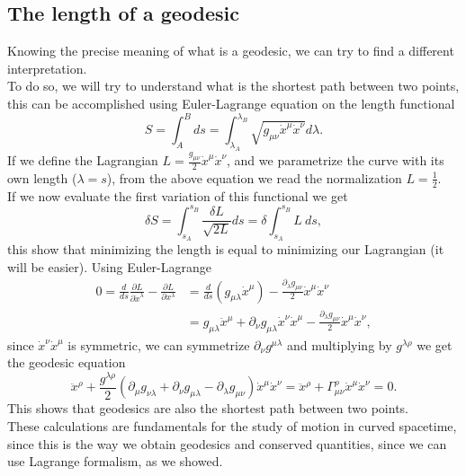 \subsection{The length of a geodesic}
Knowing the precise meaning of what is a geodesic, we can try to find a different interpretation.\\
To do so, we will try to understand what is the shortest path between two points, this can be accomplished using Euler-Lagrange equation on the length functional $$S=\int_A^B ds=\int_{\lambda_A}^{\lambda_B}\sqrt{g_{\mu\nu}\dot x^\mu\dot x^\nu}d\lambda.$$
If we define the Lagrangian $L=\frac{g_{\mu\nu}}{2}\dot x^\mu\dot x^\nu$, and we parametrize  the curve with its own length ($\lambda=s$), from the above equation we read the normalization $L=\frac{1}{2}$.\\
If we now evaluate the first variation of this functional we get $$\delta S=\int_{s_A}^{s_B}\frac{\delta L}{\sqrt{2L}}ds=\delta\int_{s_A}^{s_B}L\ ds,$$ this show that minimizing the length is equal to minimizing our Lagrangian (it will be easier). Using Euler-Lagrange
\begin{align*}
   0= \frac{d}{ds}\frac{\partial L}{\partial\dot{x}^\lambda}-\frac{\partial L}{\partial x^\lambda}&=\frac{d}{ds}(g_{\mu\lambda}\dot x^\mu)-\frac{\partial_\lambda g_{\mu\nu}}{2}\dot x^\mu\dot x^\nu\\&=g_{\mu\lambda}\ddot x^\mu+\partial_\nu g_{\mu\lambda}\dot x^\nu\dot x^\mu-\frac{\partial_\lambda g_{\mu\nu}}{2}\dot x^\mu\dot x^\nu,
\end{align*}
since $\dot x^\nu\dot x^\mu$ is symmetric, we can symmetrize $\partial_\nu g^{\mu\lambda}$ and multiplying by $g^{\lambda\rho}$ we get the geodesic equation$$ \ddot x^\rho+\frac{g^{\lambda\rho}}{2}(\partial_\mu g_{\nu\lambda}+\partial_\nu g_{\mu\lambda}-\partial_\lambda g_{\mu\nu})\dot x^\mu\dot x^\nu=\ddot x^\rho+\Gamma^\rho_{\mu\nu}\dot x^\mu\dot x^\nu=0.$$ This shows that geodesics are also the shortest path between two points.\\ These calculations are fundamentals for the study of motion in curved spacetime, since this is the way we obtain geodesics and conserved quantities, since we can use Lagrange formalism, as we showed.
